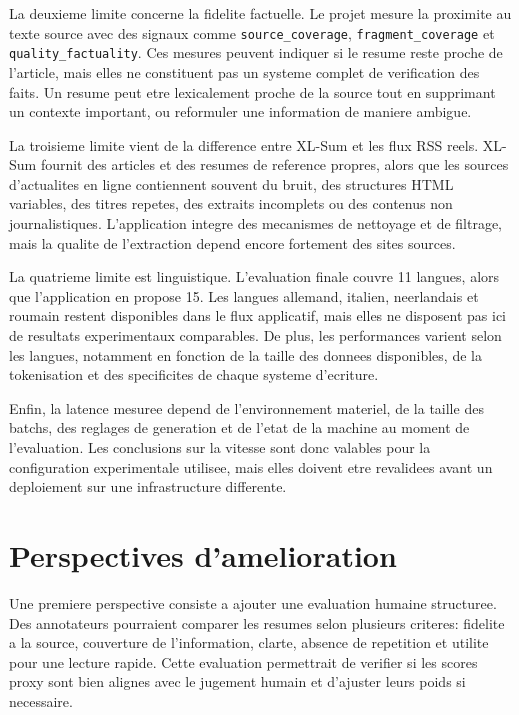 La deuxieme limite concerne la fidelite factuelle. Le projet mesure la proximite au texte source avec des signaux comme \texttt{source\_coverage}, \texttt{fragment\_coverage} et \texttt{quality\_factuality}. Ces mesures peuvent indiquer si le resume reste proche de l'article, mais elles ne constituent pas un systeme complet de verification des faits. Un resume peut etre lexicalement proche de la source tout en supprimant un contexte important, ou reformuler une information de maniere ambigue.

La troisieme limite vient de la difference entre XL-Sum et les flux RSS reels. XL-Sum fournit des articles et des resumes de reference propres, alors que les sources d'actualites en ligne contiennent souvent du bruit, des structures HTML variables, des titres repetes, des extraits incomplets ou des contenus non journalistiques. L'application integre des mecanismes de nettoyage et de filtrage, mais la qualite de l'extraction depend encore fortement des sites sources.

La quatrieme limite est linguistique. L'evaluation finale couvre 11 langues, alors que l'application en propose 15. Les langues allemand, italien, neerlandais et roumain restent disponibles dans le flux applicatif, mais elles ne disposent pas ici de resultats experimentaux comparables. De plus, les performances varient selon les langues, notamment en fonction de la taille des donnees disponibles, de la tokenisation et des specificites de chaque systeme d'ecriture.

Enfin, la latence mesuree depend de l'environnement materiel, de la taille des batchs, des reglages de generation et de l'etat de la machine au moment de l'evaluation. Les conclusions sur la vitesse sont donc valables pour la configuration experimentale utilisee, mais elles doivent etre revalidees avant un deploiement sur une infrastructure differente.

\section{Perspectives d'amelioration}

Une premiere perspective consiste a ajouter une evaluation humaine structuree. Des annotateurs pourraient comparer les resumes selon plusieurs criteres: fidelite a la source, couverture de l'information, clarte, absence de repetition et utilite pour une lecture rapide. Cette evaluation permettrait de verifier si les scores proxy sont bien alignes avec le jugement humain et d'ajuster leurs poids si necessaire.

